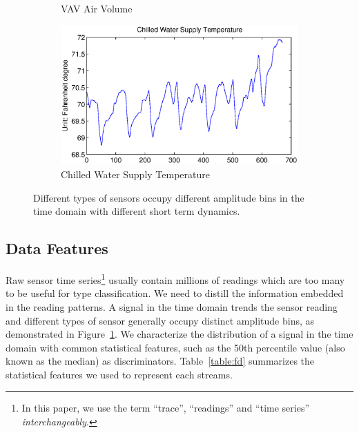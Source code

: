 \begin{figure}[ht!]
\begin{subfigure}{0.32\textwidth}
                \caption{VAV Air Volume}
  \end{subfigure}
  \begin{subfigure}{0.32\textwidth}
                \centering
    \includegraphics[width=\textwidth]{./fig/cwt.eps}
                \caption{Chilled Water Supply Temperature}
  \end{subfigure}
\caption{Different types of sensors occupy different amplitude bins in the time domain with different short term dynamics.}
\label{fig:example}
\end{figure}

\subsection{Data Features}
Raw sensor time series\footnote{In this paper, we use the term ``trace'', ``readings'' and ``time series'' \textit{interchangeably}.} usually contain millions of readings which are too many to be useful for type classification. We need to distill the information embedded in the reading patterns.
A signal in the time domain trends the sensor reading and different types of sensor generally occupy distinct amplitude bins, as demonstrated in Figure~\ref{fig:example}. 
We characterize the distribution of a signal in the time domain with common statistical features, such as the 50th percentile value (also known as the median) as discriminators. 
Table~\ref{table:fd} summarizes the statistical features we used to represent each streams. 


